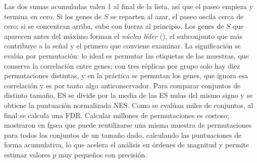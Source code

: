 Las dos sumas acumuladas valen 1 al final de la lista, así que el paseo empieza y termina en cero. Si los genes de $S$ se reparten al azar, el paseo oscila cerca de cero; si se concentran arriba, sube con fuerza al principio. Los genes de $S$ que aparecen antes del máximo forman el \emph{núcleo líder} (), el subconjunto que más contribuye a la señal y el primero que conviene examinar. La significación se evalúa por permutación: lo ideal es permutar las etiquetas de las muestras, que conserva la correlación entre genes; con tres réplicas por grupo solo hay diez permutaciones distintas, y en la práctica se permutan los genes, que ignora esa correlación y es por tanto algo anticonservador. Para comparar conjuntos de distinto tamaño, $\mathrm{ES}$ se divide por la media de las ES nulas del mismo signo y se obtiene la puntuación normalizada NES. Como se evalúan miles de conjuntos, al final se calcula una FDR. Calcular millones de permutaciones es costoso; \textcite{c11-korotkevich2016} mostraron en fgsea que puede reutilizarse una misma muestra de permutaciones para todos los conjuntos de un tamaño dado, calculando las puntuaciones de forma acumulativa, lo que acelera el análisis en órdenes de magnitud y permite estimar valores $p$ muy pequeños con precisión.

